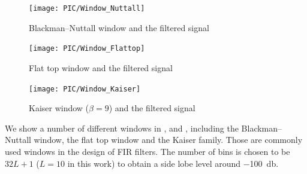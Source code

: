 \begin{figure}[htb!]
\centering
\texttt{[image: PIC/Window\_Nuttall]}
\caption{Blackman--Nuttall window and the filtered signal}\label{fig:nuttall_window}
\end{figure}
\begin{figure}[htb!]
\centering
\texttt{[image: PIC/Window\_Flattop]}
\caption{Flat top window and the filtered signal}\label{fig:flattop_window}
\end{figure}
\begin{figure}[htb!]
\centering
\texttt{[image: PIC/Window\_Kaiser]}
\caption{Kaiser window ($\beta=9$) and the filtered signal}\label{fig:kaiser_window}
\end{figure}
We show a number of different windows in ,  and , including the Blackman--Nuttall window, the flat top window and the Kaiser family. Those are commonly used windows \citep{Oppenheim2010} in the design of FIR filters. The number of bins is chosen to be $32L+1$ ($L=10$ in this work) to obtain a side lobe level around \SI{-100}{\decibel}.


